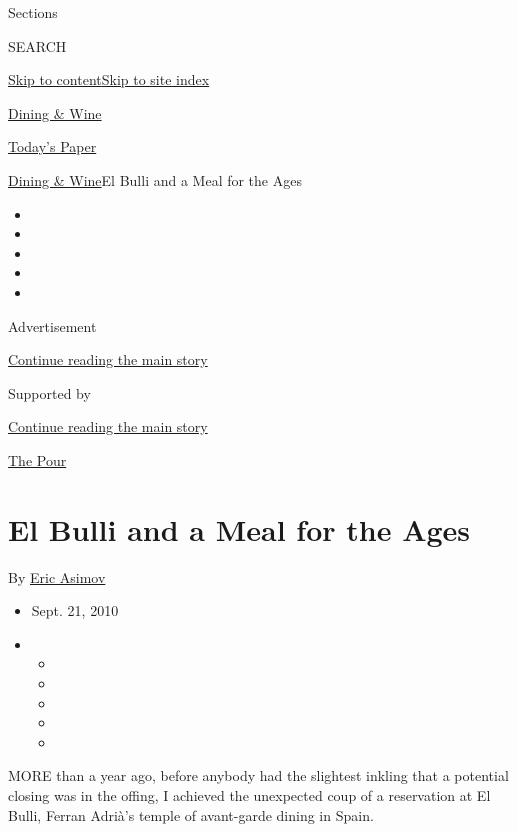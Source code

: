 Sections

SEARCH

\protect\hyperlink{site-content}{Skip to
content}\protect\hyperlink{site-index}{Skip to site index}

\href{https://www.nytimes.com/pages/dining/index.html}{Dining \& Wine}

\href{https://myaccount.nytimes.com/auth/login?response_type=cookie\&client_id=vi}{}

\href{https://www.nytimes.com/section/todayspaper}{Today's Paper}

\href{/pages/dining/index.html}{Dining \& Wine}\textbar{}El Bulli and a
Meal for the Ages

\begin{itemize}
\item
\item
\item
\item
\item
\end{itemize}

Advertisement

\protect\hyperlink{after-top}{Continue reading the main story}

Supported by

\protect\hyperlink{after-sponsor}{Continue reading the main story}

\href{/column/the-pour}{The Pour}

\hypertarget{el-bulli-and-a-meal-for-the-ages}{%
\section{El Bulli and a Meal for the
Ages}\label{el-bulli-and-a-meal-for-the-ages}}

By \href{https://www.nytimes.com/by/eric-asimov}{Eric Asimov}

\begin{itemize}
\item
  Sept. 21, 2010
\item
  \begin{itemize}
  \item
  \item
  \item
  \item
  \item
  \end{itemize}
\end{itemize}

MORE than a year ago, before anybody had the slightest inkling that a
potential closing was in the offing, I achieved the unexpected coup of a
reservation at El Bulli, Ferran Adrià's temple of avant-garde dining in
Spain.

